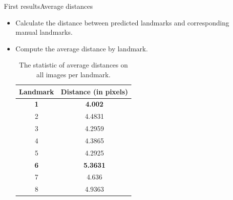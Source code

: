 \documentclass[10pt,svgnames]{beamer}
\begin{document}

\begin{frame}{First results}{Average distances}
	\begin{itemize}			
		\item Calculate the distance between predicted landmarks and corresponding manual landmarks.	
		\item Compute the average distance by landmark.\\
		
			\begin{table}[htbp]
				\centering
				\begin{tabular}{|c|c|}
					\hline
					\textbf{Landmark} & \textbf{Distance} (in pixels) \\ \hline
					\textbf{\color{green}1} & \textbf{\color{green}4.002}  \\ \hline
					2 & 4.4831 \\ \hline
					3 & 4.2959 \\ \hline
					4 & 4.3865 \\ \hline
					5 & 4.2925 \\ \hline
					\textbf{\color{red}6} & \textbf{\color{red}5.3631} \\ \hline
					7 & 4.636 \\ \hline
					8 & 4.9363 \\ \hline
				\end{tabular}
				\caption*{The statistic of average distances on all images per landmark.}
			\end{table}
	\end{itemize}
\end{frame}

\end{document}
